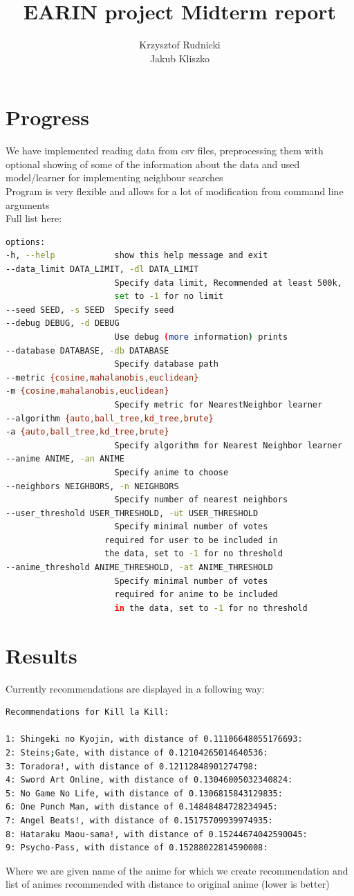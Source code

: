 \documentclass[12pt]{article}
\title{EARIN project Midterm report}
\author{Krzysztof Rudnicki \\ Jakub Kliszko}
\begin{document}
\maketitle
\section{Progress}
We have implemented reading data from csv files, preprocessing them with optional showing of some of the information about the data and used model/learner for implementing neighbour searches \\ 
Program is very flexible and allows for a lot of modification from command line arguments \\
Full list here:
\begin{lstlisting}[language=bash]
options:
-h, --help            show this help message and exit
--data_limit DATA_LIMIT, -dl DATA_LIMIT
                      Specify data limit, Recommended at least 500k,
                      set to -1 for no limit
--seed SEED, -s SEED  Specify seed
--debug DEBUG, -d DEBUG
                      Use debug (more information) prints
--database DATABASE, -db DATABASE
                      Specify database path
--metric {cosine,mahalanobis,euclidean}
-m {cosine,mahalanobis,euclidean}
                      Specify metric for NearestNeighbor learner
--algorithm {auto,ball_tree,kd_tree,brute}
-a {auto,ball_tree,kd_tree,brute}
                      Specify algorithm for Nearest Neighbor learner
--anime ANIME, -an ANIME
                      Specify anime to choose
--neighbors NEIGHBORS, -n NEIGHBORS
                      Specify number of nearest neighbors
--user_threshold USER_THRESHOLD, -ut USER_THRESHOLD
                      Specify minimal number of votes
                    required for user to be included in
                    the data, set to -1 for no threshold
--anime_threshold ANIME_THRESHOLD, -at ANIME_THRESHOLD
                      Specify minimal number of votes
                      required for anime to be included
                      in the data, set to -1 for no threshold
\end{lstlisting}
\section{Results}
Currently recommendations are displayed in a following way: 
\begin{lstlisting}[language=bash]
Recommendations for Kill la Kill:

1: Shingeki no Kyojin, with distance of 0.11106648055176693:
2: Steins;Gate, with distance of 0.12104265014640536:
3: Toradora!, with distance of 0.12112848901274798:
4: Sword Art Online, with distance of 0.13046005032340824:
5: No Game No Life, with distance of 0.1306815843129835:
6: One Punch Man, with distance of 0.14848484728234945:
7: Angel Beats!, with distance of 0.15175709939974935:
8: Hataraku Maou-sama!, with distance of 0.15244674042590045:
9: Psycho-Pass, with distance of 0.15288022814590008:
  \end{lstlisting}
  Where we are given name of the anime for which we create recommendation and list of animes recommended with distance to original anime (lower is better)
\end{document}
